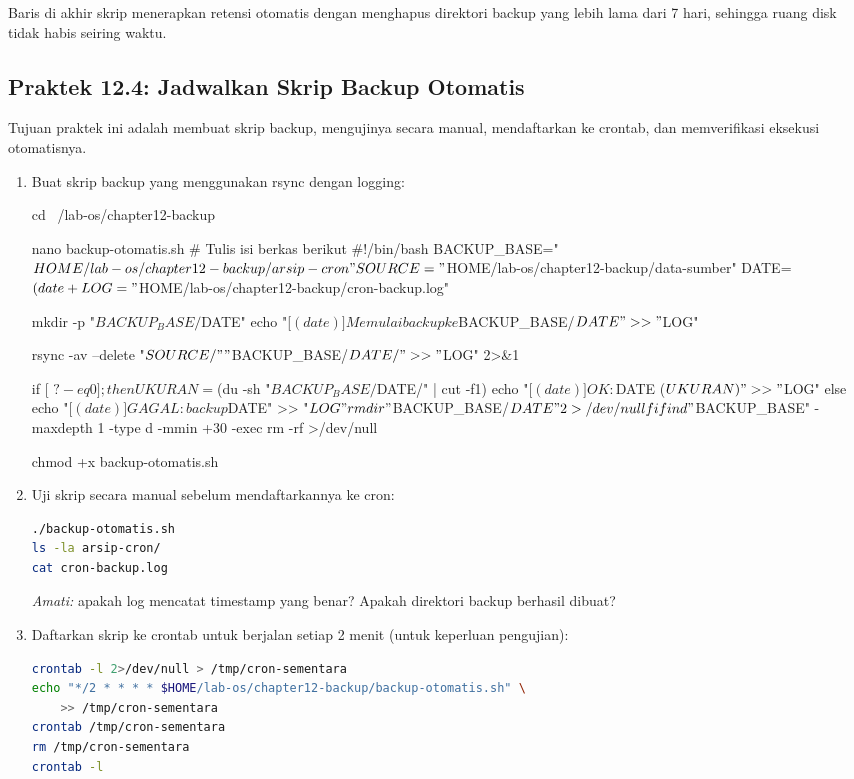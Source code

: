 Baris  di akhir skrip menerapkan retensi otomatis dengan menghapus
direktori backup yang lebih lama dari 7 hari, sehingga ruang disk tidak habis
seiring waktu.

\subsection*{Praktek 12.4: Jadwalkan Skrip Backup Otomatis}

Tujuan praktek ini adalah membuat skrip backup, mengujinya secara manual,
mendaftarkan ke crontab, dan memverifikasi eksekusi otomatisnya.

\begin{enumerate}
    \item Buat skrip backup yang menggunakan rsync dengan logging:
\begin{longlisting}[language=bash, caption={Membuat skrip backup otomatis}]
cd ~/lab-os/chapter12-backup

nano backup-otomatis.sh
# Tulis isi berkas berikut
#!/bin/bash
BACKUP_BASE="$HOME/lab-os/chapter12-backup/arsip-cron"
SOURCE="$HOME/lab-os/chapter12-backup/data-sumber"
DATE=$(date +%
LOG="$HOME/lab-os/chapter12-backup/cron-backup.log"

mkdir -p "$BACKUP_BASE/$DATE"
echo "[$(date)] Memulai backup ke $BACKUP_BASE/$DATE" >> "$LOG"

rsync -av --delete "$SOURCE/" "$BACKUP_BASE/$DATE/" >> "$LOG" 2>&1

if [ $? -eq 0 ]; then
    UKURAN=$(du -sh "$BACKUP_BASE/$DATE/" | cut -f1)
    echo "[$(date)] OK: $DATE ($UKURAN)" >> "$LOG"
else
    echo "[$(date)] GAGAL: backup $DATE" >> "$LOG"
    rmdir "$BACKUP_BASE/$DATE" 2>/dev/null
fi

find "$BACKUP_BASE" -maxdepth 1 -type d -mmin +30 -exec rm -rf {} >/dev/null

chmod +x backup-otomatis.sh
\end{longlisting}

    \item Uji skrip secara manual sebelum mendaftarkannya ke cron:
\begin{lstlisting}[language=bash, caption={Uji eksekusi manual skrip backup}]
./backup-otomatis.sh
ls -la arsip-cron/
cat cron-backup.log
\end{lstlisting}
    \textit{Amati:} apakah log mencatat timestamp yang benar? Apakah direktori
    backup berhasil dibuat?

    \item Daftarkan skrip ke crontab untuk berjalan setiap 2 menit (untuk
        keperluan pengujian):
\begin{lstlisting}[language=bash, caption={Mendaftarkan skrip ke crontab}]
crontab -l 2>/dev/null > /tmp/cron-sementara
echo "*/2 * * * * $HOME/lab-os/chapter12-backup/backup-otomatis.sh" \
    >> /tmp/cron-sementara
crontab /tmp/cron-sementara
rm /tmp/cron-sementara
crontab -l
\end{lstlisting}


\end{enumerate}
